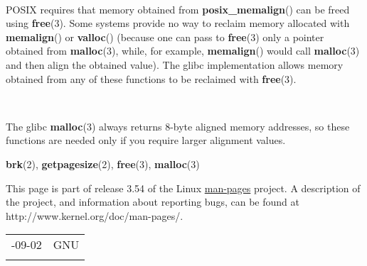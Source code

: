 \documentclass[]{article}
\let\realtextbf=\textbf
\renewcommand{\textbf}[1]{\textcolor{boldcolor}{\realtextbf{#1}}}
\renewcommand{\emph}[1]{\underline{#1}}
\begin{document}
~

POSIX requires that memory obtained from \textbf{posix\_memalign}() can
be freed using \textbf{free}(3). Some systems provide no way to reclaim
memory allocated with \textbf{memalign}() or \textbf{valloc}() (because
one can pass to \textbf{free}(3) only a pointer obtained from
\textbf{malloc}(3), while, for example, \textbf{memalign}() would call
\textbf{malloc}(3) and then align the obtained value). The glibc
implementation allows memory obtained from any of these functions to be
reclaimed with \textbf{free}(3).

~

The glibc \textbf{malloc}(3) always returns 8-byte aligned memory
addresses, so these functions are needed only if you require larger
alignment values.


\textbf{brk}(2), \textbf{getpagesize}(2), \textbf{free}(3),
\textbf{malloc}(3)


This page is part of release 3.54 of the Linux \emph{man-pages} project.
A description of the project, and information about reporting bugs, can
be found at http://www.kernel.org/doc/man-pages/.

\begin{longtable}[c]{@{}ll@{}}
\toprule\addlinespace
2013-09-02 & GNU
\\\addlinespace
\bottomrule
\end{longtable}
\end{document}
